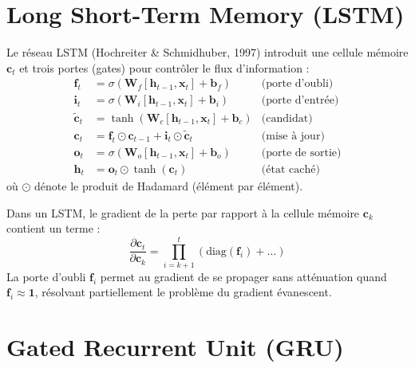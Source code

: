 \section{Long Short-Term Memory (LSTM)}
\label{sec:seq:lstm}

\begin{definition}[LSTM]
Le r\'eseau LSTM (Hochreiter \& Schmidhuber, 1997) introduit une cellule
m\'emoire $\mathbf{c}_t$ et trois portes (gates) pour contr\^oler le flux
d'information :
\begin{align}
\mathbf{f}_t &= \sigma(\mathbf{W}_f [\mathbf{h}_{t-1}, \mathbf{x}_t] + \mathbf{b}_f) & \text{(porte d'oubli)} \\
\mathbf{i}_t &= \sigma(\mathbf{W}_i [\mathbf{h}_{t-1}, \mathbf{x}_t] + \mathbf{b}_i) & \text{(porte d'entr\'ee)} \\
\tilde{\mathbf{c}}_t &= \tanh(\mathbf{W}_c [\mathbf{h}_{t-1}, \mathbf{x}_t] + \mathbf{b}_c) & \text{(candidat)} \\
\mathbf{c}_t &= \mathbf{f}_t \odot \mathbf{c}_{t-1} + \mathbf{i}_t \odot \tilde{\mathbf{c}}_t & \text{(mise \`a jour)} \\
\mathbf{o}_t &= \sigma(\mathbf{W}_o [\mathbf{h}_{t-1}, \mathbf{x}_t] + \mathbf{b}_o) & \text{(porte de sortie)} \\
\mathbf{h}_t &= \mathbf{o}_t \odot \tanh(\mathbf{c}_t) & \text{(\'etat cach\'e)}
\end{align}
o\`u $\odot$ d\'enote le produit de Hadamard (\'el\'ement par \'el\'ement).
\end{definition}

\begin{proposition}
Dans un LSTM, le gradient de la perte par rapport \`a la cellule m\'emoire
$\mathbf{c}_k$ contient un terme :
\[
\frac{\partial \mathbf{c}_t}{\partial \mathbf{c}_k} = \prod_{i=k+1}^{t} \left(\text{diag}(\mathbf{f}_i) + \ldots\right)
\]
La porte d'oubli $\mathbf{f}_i$ permet au gradient de se propager sans
att\'enuation quand $\mathbf{f}_i \approx \mathbf{1}$, r\'esolvant
partiellement le probl\`eme du gradient \'evanescent.
\end{proposition}

\section{Gated Recurrent Unit (GRU)}
\label{sec:seq:gru}

